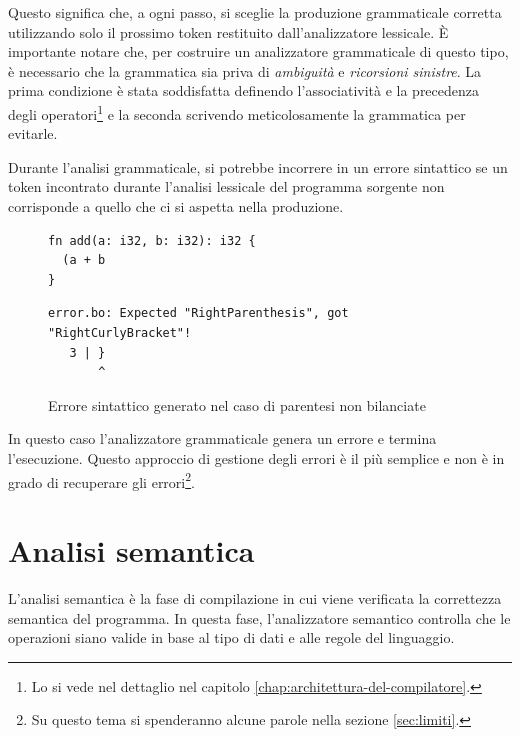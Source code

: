 Questo significa che, a ogni passo, si sceglie la produzione grammaticale corretta utilizzando solo il prossimo token restituito dall'analizzatore lessicale. \`E importante notare che, per costruire un analizzatore grammaticale di questo tipo, \`e necessario che la grammatica sia priva di \emph{ambiguit\`a} e \emph{ricorsioni sinistre}. La prima condizione \`e stata soddisfatta definendo l'associativit\`a e la precedenza degli operatori\footnote{Lo si vede nel dettaglio nel capitolo \ref{chap:architettura-del-compilatore}.} e la seconda scrivendo meticolosamente la grammatica per evitarle.

Durante l'analisi grammaticale, si potrebbe incorrere in un errore sintattico se un token incontrato durante l'analisi lessicale del programma sorgente non corrisponde a quello che ci si aspetta nella produzione.
\begin{figure}[H]
	\centering
	\begin{verbatim}
fn add(a: i32, b: i32): i32 {
  (a + b
}
	\end{verbatim}
	\begin{verbatim}
error.bo: Expected "RightParenthesis", got "RightCurlyBracket"!
   3 | }
       ^
	\end{verbatim}
	\caption{Errore sintattico generato nel caso di parentesi non bilanciate}
	\label{fig:bugginout-syntax-error}
\end{figure}
In questo caso l'analizzatore grammaticale genera un errore e termina l'esecuzione. Questo approccio di gestione degli errori \`e il pi\`u semplice e non \`e in grado di recuperare gli errori\footnote{Su questo tema si spenderanno alcune parole nella sezione \ref{sec:limiti}.}.

\section{Analisi semantica}
\label{sec:analisi-semantica}

L'analisi semantica \`e la fase di compilazione in cui viene verificata la correttezza semantica del programma. In questa fase, l'analizzatore semantico controlla che le operazioni siano valide in base al tipo di dati e alle regole del linguaggio.

